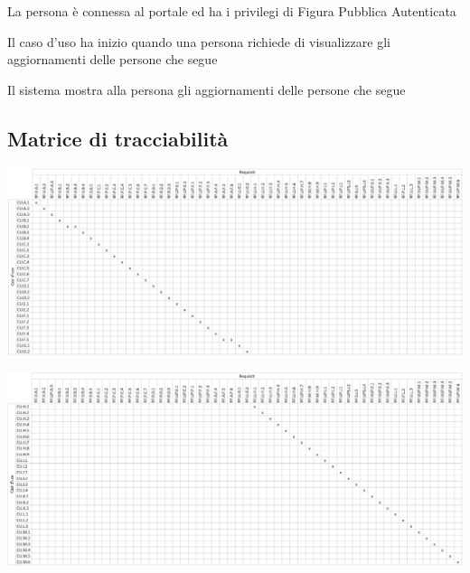 \tabcuvspace

%

{}
{La persona è connessa al portale ed ha i privilegi di Figura Pubblica Autenticata}
{\postNulle}
{\begin{enumCU}
	\item Il caso d'uso ha inizio quando una persona richiede di visualizzare gli aggiornamenti delle persone che segue
	\item Il sistema mostra alla persona gli aggiornamenti delle persone che segue
\end{enumCU}}

\begin{landscape}
\section{Matrice di tracciabilità}
\begin{center}
	\includegraphics[width=\linewidth]{assets/matricetracciabilita0}
\end{center}
\end{landscape}

\begin{landscape}
\begin{center}
	\includegraphics[width=\linewidth]{assets/matricetracciabilita1}
\end{center}
\end{landscape}

